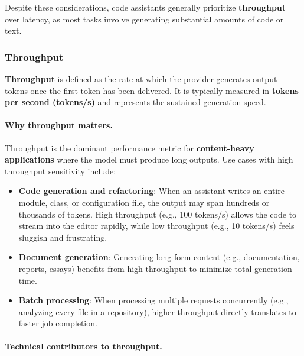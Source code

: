 \documentclass[english]{article}
\begin{document}
Despite these considerations, code assistants generally prioritize \textbf{throughput} over latency, as most tasks involve generating substantial amounts of code or text.


\subsubsection{Throughput}

\textbf{Throughput} is defined as the rate at which the provider generates output tokens once the first token has been delivered. It is typically measured in \textbf{tokens per second (tokens/s)} and represents the sustained generation speed.

\paragraph{Why throughput matters.}

Throughput is the dominant performance metric for \textbf{content-heavy applications} where the model must produce long outputs. Use cases with high throughput sensitivity include:
\begin{itemize}
    \item \textbf{Code generation and refactoring}: When an assistant writes an entire module, class, or configuration file, the output may span hundreds or thousands of tokens. High throughput (e.g., 100 tokens/s) allows the code to stream into the editor rapidly, while low throughput (e.g., 10 tokens/s) feels sluggish and frustrating.
    \item \textbf{Document generation}: Generating long-form content (e.g., documentation, reports, essays) benefits from high throughput to minimize total generation time.
    \item \textbf{Batch processing}: When processing multiple requests concurrently (e.g., analyzing every file in a repository), higher throughput directly translates to faster job completion.
\end{itemize}

\paragraph{Technical contributors to throughput.}
\end{document}

